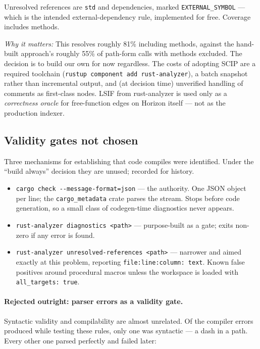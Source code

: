 \documentclass[11pt,a4paper]{article}
\newcommand{\note}{\par\smallskip\noindent\textit{Why it matters:} }
\begin{document}
Unresolved references are \verb|std| and dependencies, marked
\verb|EXTERNAL_SYMBOL| --- which is the intended external-dependency rule,
implemented for free. Coverage includes methods.

\note{This resolves roughly 81\% including methods, against the hand-built
approach's roughly 55\% of path-form calls with methods excluded. The decision
is to build our own for now regardless. The costs of adopting SCIP are a required
toolchain (\verb|rustup component add rust-analyzer|), a batch snapshot rather
than incremental output, and (at decision time) unverified handling of comments
as first-class nodes. LSIF from rust-analyzer is used only as a
\emph{correctness oracle} for free-function edges on Horizon itself --- not as
the production indexer.}

\subsection{Validity gates not chosen}
\label{sec:gates}

Three mechanisms for establishing that code compiles were identified. Under the
``build always'' decision they are unused; recorded for history.

\begin{itemize}[nosep]
  \item \verb|cargo check --message-format=json| --- the authority. One JSON
    object per line; the \verb|cargo_metadata| crate parses the stream. Stops
    before code generation, so a small class of codegen-time diagnostics never
    appears.
  \item \verb|rust-analyzer diagnostics <path>| --- purpose-built as a gate;
    exits non-zero if any error is found.
  \item \verb|rust-analyzer unresolved-references <path>| --- narrower and
    aimed exactly at this problem, reporting \verb|file:line:column: text|. Known
    false positives around procedural macros unless the workspace is loaded with
    \verb|all_targets: true|.
\end{itemize}

\paragraph{Rejected outright: parser errors as a validity gate.} Syntactic
validity and compilability are almost unrelated. Of the compiler errors produced
while testing these rules, only one was syntactic --- a dash in a path. Every
other one parsed perfectly and failed later:
\end{document}
